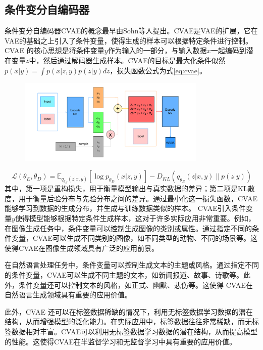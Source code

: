 \subsection{条件变分自编码器}
条件变分自编码器CVAE的概念最早由Sohn等人提出\cite{SohnLee2015ConditionalVAE}。CVAE是VAE的扩展，它在VAE的基础之上引入了条件变量，使得生成的样本可以根据特定条件进行控制。CVAE 的核心思想是将条件变量$y$作为输入的一部分，与输入数据$x$一起编码到潜在变量$z$中，然后通过解码器生成样本。CVAE的目标是最大化条件似然$p(x|y) = \int p(x|z,y) p(z|y) dz$，损失函数公式为式\ref{eq:cvae}。
\begin{figure}[htbp]
  \centering
  \includegraphics[width=0.8\textwidth]{Fig/CVAE示意图.drawio.pdf}
\end{figure}
\begin{equation}
  \mathcal{L}(\theta_E, \theta_D) = \mathbb{E}_{q_{\theta_E}(z|x,y)} \left[ \log p_{\theta_D}(x|z,y) \right] - D_{KL}(q_{\theta_E}(z|x,y) \| p(z|y))
  \label{eq:cvae}
\end{equation}
其中，第一项是重构损失，用于衡量模型输出与真实数据的差异；第二项是KL散度，用于衡量后验分布与先验分布之间的差异。通过最小化这一损失函数，CVAE能够学习到数据的生成分布，并生成与训练数据类似的样本。
CVAE引入条件变量$y$使得模型能够根据特定条件生成样本，这对于许多实际应用非常重要。例如，在图像生成任务中，条件变量可以控制生成图像的类别或属性。通过指定不同的条件变量，CVAE可以生成不同类别的图像，如不同类型的动物、不同的场景等。这使得CVAE在图像生成领域具有广泛的应用前景。

在自然语言处理任务中，条件变量可以控制生成文本的主题或风格。通过指定不同的条件变量，CVAE可以生成不同主题的文本，如新闻报道、故事、诗歌等。此外，条件变量还可以控制文本的风格，如正式、幽默、悲伤等。这使得 CVAE在自然语言生成领域具有重要的应用价值。

此外，CVAE 还可以在标签数据稀缺的情况下，利用无标签数据学习数据的潜在结构，从而增强模型的泛化能力。在实际应用中，标签数据往往非常稀缺，而无标签数据相对丰富。CVAE可以利用无标签数据学习数据的潜在结构，从而提高模型的性能。这使得CVAE在半监督学习和无监督学习中具有重要的应用价值。

